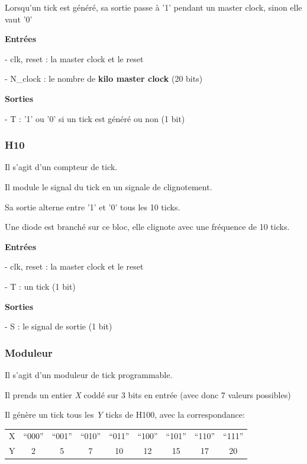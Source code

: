 \documentclass[10pt]{article}
\begin{document}
        Lorsqu'un tick est généré, sa sortie passe à '1' pendant un master clock, sinon elle vaut '0'
        
        \textbf{Entrées}
        
            - clk, reset : la master clock et le reset
            
            - N\_clock : le nombre de \textbf{kilo master clock} (20 bits)
                            
        \textbf{Sorties}
            
            - T : '1' ou '0' si un tick est généré ou non (1 bit)
        
        \subsubsection{H10}
        
        Il s'agit d'un compteur de tick.
                
        Il module le signal du tick en un signale de clignotement.
        
        Sa sortie alterne entre '1' et '0' tous les 10 ticks.
        
        Une diode est branché sur ce bloc, elle clignote avec une fréquence de 10 ticks.
                
        \textbf{Entrées}
        
            - clk, reset : la master clock et le reset
            
            - T : un tick (1 bit)
                            
        \textbf{Sorties}
            
            - S : le signal de sortie (1 bit)
        
        \subsubsection{Moduleur}
        
        Il s'agit d'un moduleur de tick programmable.
                
        Il prends un entier \textit{X} coddé sur 3 bits en entrée (avec donc 7 valeurs possibles)
        
        Il génère un tick tous les \textit{Y} ticks de H100, avec la correspondance:
        
        \begin{table}[h]
            \centering
            \begin{tabular}{ccccccccc}
                   X & ``000'' & ``001'' & ``010'' & ``011'' & ``100'' & ``101'' & ``110'' & ``111'' \\
                   Y &    2    &    5    &    7    &    10   &    12   &   15    &   17    &    20   \\
            \end{tabular}
        \end{table}
        
\end{document}
